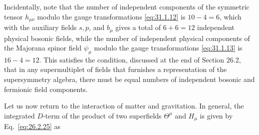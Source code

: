 Incidentally, note that the number of independent components of the symmetric
tensor \(h_{\mu\nu}\) modulo the gauge transformations \eqref{eq:31.1.12} is
\(10-4=6\), which with the auxiliary fields \(s,p\), and \(b_\mu\) gives a
total of \(6+6=12\) independent physical bosonic fields, while the number of
independent physical components of the Majorana spinor field \(\psi_\mu\)
modulo the gauge transformations \eqref{eq:31.1.13} is \(16-4=12\). This
satisfies the condition, discussed at the end of Section 26.2, that in any
supermultiplet of fields that furnishes a representation of the supersymmetry
algebra, there must be equal numbers of independent bosonic and fermionic
field components.

Let us now return to the interaction of matter and gravitation. In general,
the integrated \(D\)-term of the product of two superfields \(\Theta^\mu\)
and \(H_\mu\) is given by Eq.~\eqref{eq:26.2.25} as
